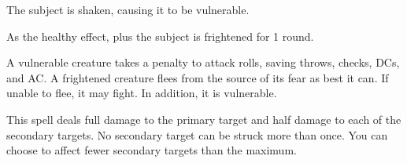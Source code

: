 \spellrng{\rngclose}
\begin{spellhealthy}
  The subject is shaken, causing it to be vulnerable.
\end{spellhealthy}
\begin{spellblood}
  As the healthy effect, plus the subject is frightened for 1 round.
\end{spellblood}
\begin{spellnotes}
  A vulnerable creature takes a  penalty to attack rolls, saving throws, checks, DCs, and AC. A frightened creature flees from the source of its fear as best it can. If unable to flee, it may fight. In addition, it is vulnerable.
\end{spellnotes}

\spellrng{\rngmed}
\begin{spelleffect}
  This spell deals full damage to the primary target and half damage to each of the secondary targets. No secondary target can be struck more than once. You can choose to affect fewer secondary targets than the maximum.
\end{spelleffect}

